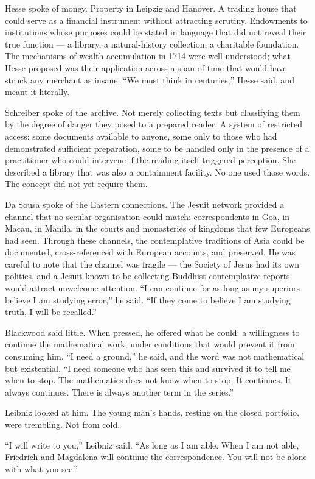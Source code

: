 Hesse spoke of money. Property in Leipzig and Hanover. A trading house that could serve as a financial instrument without attracting scrutiny. Endowments to institutions whose purposes could be stated in language that did not reveal their true function --- a library, a natural-history collection, a charitable foundation. The mechanisms of wealth accumulation in 1714 were well understood; what Hesse proposed was their application across a span of time that would have struck any merchant as insane. ``We must think in centuries,'' Hesse said, and meant it literally.

Schreiber spoke of the archive. Not merely collecting texts but classifying them by the degree of danger they posed to a prepared reader. A system of restricted access: some documents available to anyone, some only to those who had demonstrated sufficient preparation, some to be handled only in the presence of a practitioner who could intervene if the reading itself triggered perception. She described a library that was also a containment facility. No one used those words. The concept did not yet require them.

Da Sousa spoke of the Eastern connections. The Jesuit network provided a channel that no secular organisation could match: correspondents in Goa, in Macau, in Manila, in the courts and monasteries of kingdoms that few Europeans had seen. Through these channels, the contemplative traditions of Asia could be documented, cross-referenced with European accounts, and preserved. He was careful to note that the channel was fragile --- the Society of Jesus had its own politics, and a Jesuit known to be collecting Buddhist contemplative reports would attract unwelcome attention. ``I can continue for as long as my superiors believe I am studying error,'' he said. ``If they come to believe I am studying truth, I will be recalled.''

Blackwood said little. When pressed, he offered what he could: a willingness to continue the mathematical work, under conditions that would prevent it from consuming him. ``I need a ground,'' he said, and the word was not mathematical but existential. ``I need someone who has seen this and survived it to tell me when to stop. The mathematics does not know when to stop. It continues. It always continues. There is always another term in the series.''

Leibniz looked at him. The young man's hands, resting on the closed portfolio, were trembling. Not from cold.

``I will write to you,'' Leibniz said. ``As long as I am able. When I am not able, Friedrich and Magdalena will continue the correspondence. You will not be alone with what you see.''

